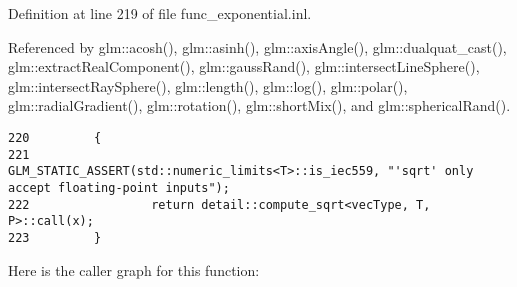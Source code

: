Definition at line 219 of file func\_\-exponential.inl.

Referenced by glm::acosh(), glm::asinh(), glm::axisAngle(), glm::dualquat\_\-cast(), glm::extractRealComponent(), glm::gaussRand(), glm::intersectLineSphere(), glm::intersectRaySphere(), glm::length(), glm::log(), glm::polar(), glm::radialGradient(), glm::rotation(), glm::shortMix(), and glm::sphericalRand().

\begin{Code}\begin{verbatim}220         {
221                 GLM_STATIC_ASSERT(std::numeric_limits<T>::is_iec559, "'sqrt' only accept floating-point inputs");
222                 return detail::compute_sqrt<vecType, T, P>::call(x);
223         }
\end{verbatim}
\end{Code}




Here is the caller graph for this function: